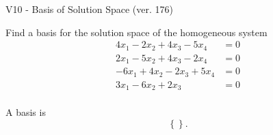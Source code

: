 \begin{exercise}
  \begin{exerciseTitle}V10 - Basis of Solution Space (ver. 176)\end{exerciseTitle}
  \begin{exerciseStatement}
    Find a basis for the solution space of the homogeneous system 
\begin{align*}
 4 x_ 1 -2 x_ 2 + 4 x_ 3 -5 x_ 4 &= 0  \\ 
  2 x_ 1 -5 x_ 2 + 4 x_ 3 -2 x_ 4 &= 0  \\ 
  -6 x_ 1 + 4 x_ 2 -2 x_ 3 + 5 x_ 4 &= 0  \\ 
  3 x_ 1 -6 x_ 2 + 2 x_ 3 &= 0  \\ 
 \end{align*}


 
  \end{exerciseStatement}

  \begin{exerciseAnswer}
   A basis is   
\[\left\{\right\}.\]

  


  \end{exerciseAnswer}
\end{exercise}